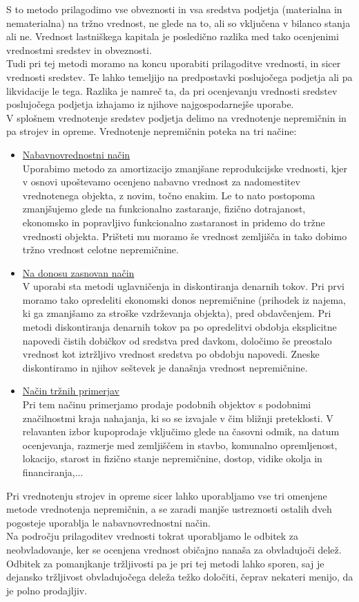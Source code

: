 \documentclass[12pt,a4paper]{amsart}
\theoremstyle{definition} %
\theoremstyle{plain} %
\begin{document}
S to metodo prilagodimo vse obveznosti in vsa sredstva podjetja (materialna in nematerialna) na tržno vrednost, ne glede na to, ali so vključena v bilanco stanja ali ne. Vrednost lastniškega kapitala je posledično razlika med tako ocenjenimi vrednostmi sredstev in obveznosti.\\
Tudi pri tej metodi moramo na koncu uporabiti prilagoditve vrednosti, in sicer vrednosti sredstev. Te lahko temeljijo na predpostavki poslujočega podjetja ali pa likvidacije le tega. Razlika je namreč ta, da pri ocenjevanju vrednosti sredstev poslujočega podjetja izhajamo iz njihove najgospodarnejše uporabe.\\
V splošnem vrednotenje sredstev podjetja delimo na vrednotenje nepremičnin in pa strojev in opreme. Vrednotenje nepremičnin poteka na tri načine:
\begin{itemize}
\item \underline{Nabavnovrednostni način}\\
Uporabimo metodo za amortizacijo zmanjšane reprodukcijske vrednosti, kjer v osnovi upoštevamo ocenjeno nabavno vrednost za nadomestitev vrednotenega objekta, z novim, točno enakim. Le to nato postopoma zmanjšujemo glede na funkcionalno zastaranje, fizično dotrajanost, ekonomsko in popravljivo funkcionalno zastaranost in pridemo do tržne vrednosti objekta. Prišteti mu moramo še vrednost zemljišča in tako dobimo tržno vrednost celotne nepremičnine.
\item \underline{ Na donosu zasnovan način}\\
V uporabi sta metodi uglavničenja in diskontiranja denarnih tokov. Pri prvi moramo tako opredeliti ekonomski donos nepremičnine (prihodek iz najema, ki ga zmanjšamo za stroške vzdrževanja objekta), pred obdavčenjem. Pri metodi diskontiranja denarnih tokov pa po opredelitvi obdobja eksplicitne napovedi čistih dobičkov od sredstva pred davkom, določimo še preostalo vrednost kot iztržljivo vrednost sredstva po obdobju napovedi. Zneske diskontiramo in njihov seštevek je današnja vrednost nepremičnine.
\item \underline{Način tržnih primerjav}\\
Pri tem načinu primerjamo prodaje podobnih objektov s podobnimi značilnostmi kraja nahajanja, ki so se izvajale v čim bližnji preteklosti. V relavanten izbor kupoprodaje vključimo glede na časovni odmik, na datum ocenjevanja, razmerje med zemljiščem in stavbo, komunalno opremljenost, lokacijo, starost in fizično stanje nepremičnine, dostop, vidike okolja in financiranja,... 
\end{itemize}
Pri vrednotenju strojev in opreme sicer lahko uporabljamo vse tri omenjene metode vrednotenja nepremičnin, a se zaradi manjše ustreznosti ostalih dveh pogosteje uporablja le nabavnovrednostni način.\\
Na področju prilagoditev vrednosti tokrat uporabljamo le odbitek za neobvladovanje, ker se ocenjena vrednost običajno nanaša za obvladujoči delež. Odbitek za pomanjkanje tržljivosti pa je pri tej metodi lahko sporen, saj je dejansko tržljivost obvladujočega deleža težko določiti, čeprav nekateri menijo, da je polno prodajljiv.
\end{document}
